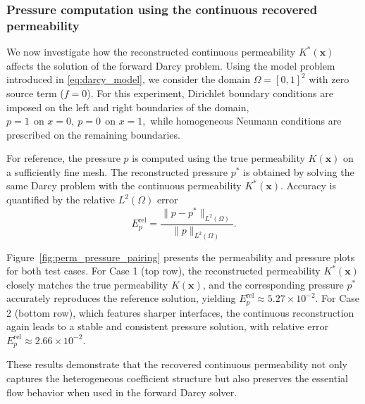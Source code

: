 \documentclass[final,1p,times]{elsarticle}
\theoremstyle{plain}
\theoremstyle{definition}
\theoremstyle{remark}
\newcommand{\bx}{\mathbf{x}}
\begin{document}
\subsubsection{Pressure computation using the continuous recovered permeability}

We now investigate how the reconstructed continuous permeability
$K^*(\bx)$ affects the solution of the forward Darcy problem.
Using the model problem introduced in \eqref{eq:darcy_model}, we consider
the domain $\Omega=[0,1]^2$ with zero source term ($f=0$). For this
experiment, Dirichlet boundary conditions are imposed on the left and
right boundaries of the domain,
$
p = 1 ~~\text{on } x=0, ~
p = 0 ~~ \text{on } x=1,
$
while homogeneous Neumann conditions are prescribed on the remaining
boundaries.

For reference, the pressure $p$ is computed using the true permeability $K(\bx)$
on a sufficiently fine mesh. The reconstructed pressure $p^*$ is obtained by
solving the same Darcy problem with the continuous permeability $K^*(\bx)$.
Accuracy is quantified by the relative $L^2(\Omega)$ error
\begin{equation}
E_p^{\mathrm{rel}}
=
\frac{\|p - p^*\|_{L^2(\Omega)}}{\|p\|_{L^2(\Omega)}} .
\label{eq:pressure_L2_error}
\end{equation}

Figure~\ref{fig:perm_pressure_pairing} presents the permeability and pressure plots for both test cases.
For Case 1 (top row), the reconstructed permeability $K^*(\bx)$ closely matches the true permeability $K(\bx)$, and the corresponding pressure $p^*$ accurately reproduces the reference solution, yielding $E_p^{\mathrm{rel}} \approx 5.27\times10^{-2}$. For Case 2 (bottom row), which features sharper interfaces, the continuous reconstruction again leads to a stable and consistent pressure solution, with relative error
$E_p^{\mathrm{rel}} \approx 2.66\times10^{-2}$.

These results demonstrate that the recovered continuous permeability not only captures the heterogeneous coefficient structure but also preserves the essential flow behavior when used in the forward Darcy solver.
\end{document}
